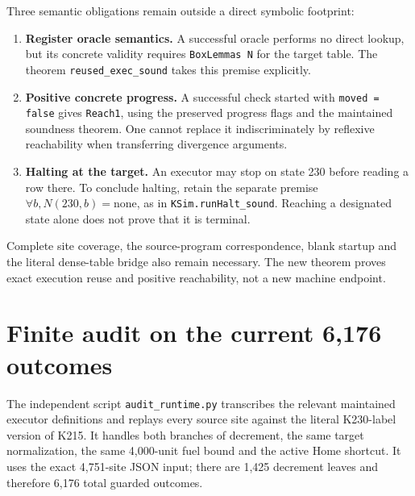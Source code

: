 \documentclass[11pt]{article}
\theoremstyle{definition}\newtheorem{definition}[theorem]{Definition}
\newcommand{\code}[1]{\texttt{#1}}
\begin{document}
Three semantic obligations remain outside a direct symbolic footprint:
\begin{enumerate}
\item \textbf{Register oracle semantics.} A successful oracle performs no direct
lookup, but its concrete validity requires \code{BoxLemmas N} for the target
table. The theorem \code{reused\_exec\_sound} takes this premise explicitly.
\item \textbf{Positive concrete progress.} A successful check started with
\code{moved = false} gives \code{Reach1}, using the preserved progress flags
and the maintained soundness theorem. One cannot replace it indiscriminately
by reflexive reachability when transferring divergence arguments.
\item \textbf{Halting at the target.} An executor may stop on state 230 before
reading a row there. To conclude halting, retain the separate premise
\(\forall b, N(230,b)=\mathrm{none}\), as in \code{KSim.runHalt\_sound}.
Reaching a designated state alone does not prove that it is terminal.
\end{enumerate}
Complete site coverage, the source-program correspondence, blank startup and
the literal dense-table bridge also remain necessary. The new theorem proves
exact execution reuse and positive reachability, not a new machine endpoint.

\section{Finite audit on the current 6,176 outcomes}

The independent script \code{audit\_runtime.py} transcribes the relevant
maintained executor definitions and replays every source site against the
literal K230-label version of K215. It handles both branches of decrement,
the same target normalization, the same 4,000-unit fuel bound and the active
Home shortcut. It uses the exact 4,751-site JSON input; there are 1,425
decrement leaves and therefore 6,176 total guarded outcomes.
\end{document}

